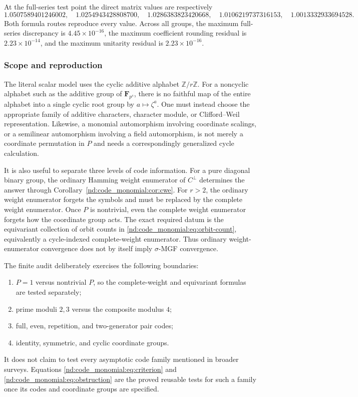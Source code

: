 \documentclass[10pt]{article}
\newcommand{\Z}{\mathbb Z}
\begin{document}
At the full-series test point the direct matrix values are respectively
\[
 1.0507589401246002,\quad
 1.0254943428808700,\quad
 1.0286383823420668,\quad
 1.0106219737316153,\quad
 1.0013332933694528.
\]
Both formula routes reproduce every value.  Across all groups, the maximum
full-series discrepancy is $4.45\times10^{-16}$, the maximum coefficient
rounding residual is $2.23\times10^{-14}$, and the maximum unitarity residual
is $2.23\times10^{-16}$.

\subsubsection{Scope and reproduction}

The literal scalar model uses the cyclic additive alphabet $\Z/r\Z$.  For a
noncyclic alphabet such as the additive group of $\mathbf F_{p^s}$, there is
no faithful map of the entire alphabet into a single cyclic root group by
$a\mapsto\zeta^a$.  One must instead choose the appropriate family of
additive characters, character module, or Clifford--Weil representation.
Likewise, a monomial automorphism involving coordinate scalings, or a
semilinear automorphism involving a field automorphism, is not merely a
coordinate permutation in $P$ and needs a correspondingly generalized
cycle calculation.

It is also useful to separate three levels of code information.  For a pure
diagonal binary group, the ordinary Hamming weight enumerator of $C^\perp$
determines the answer through Corollary~\ref{nd:code_monomial:cor:cwe}.  For $r>2$, the
ordinary weight enumerator forgets the symbols and must be replaced by the
complete weight enumerator.  Once $P$ is nontrivial, even the complete weight
enumerator forgets how the coordinate group acts.  The exact required datum
is the equivariant collection of orbit counts in
\eqref{nd:code_monomial:eq:orbit-count}, equivalently a cycle-indexed complete-weight
enumerator.  Thus ordinary weight-enumerator convergence does not by itself
imply $\sigma$-MGF convergence.

The finite audit deliberately exercises the following boundaries:
\begin{enumerate}
\item $P=1$ versus nontrivial $P$, so the complete-weight and equivariant
formulas are tested separately;
\item prime moduli $2,3$ versus the composite modulus $4$;
\item full, even, repetition, and two-generator pair codes;
\item identity, symmetric, and cyclic coordinate groups.
\end{enumerate}
It does not claim to test every asymptotic code family mentioned in broader
surveys.  Equations \eqref{nd:code_monomial:eq:criterion} and \eqref{nd:code_monomial:eq:obstruction} are the
proved reusable tests for such a family once its codes and coordinate groups
are specified.
\end{document}
